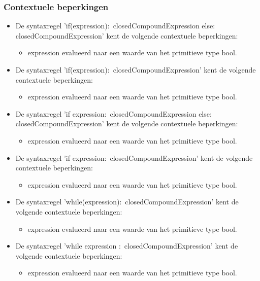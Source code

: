    \subsubsection{Contextuele beperkingen}
        \begin{itemize}
        \item De syntaxregel 'if(expression)$\colon$ closedCompoundExpression else$\colon$ closedCompoundExpression' kent de volgende contextuele beperkingen:
            \begin{itemize}
            \item expression evalueerd naar een waarde van het primitieve type bool.
            \end{itemize}
        \item De syntaxregel 'if(expression)$\colon$ closedCompoundExpression' kent de volgende contextuele beperkingen:
            \begin{itemize}
            \item expression evalueerd naar een waarde van het primitieve type bool.
            \end{itemize}
        \item De syntaxregel 'if expression$\colon$ closedCompoundExpression else$\colon$ closedCompoundExpression' kent de volgende contextuele beperkingen:
            \begin{itemize}
            \item expression evalueerd naar een waarde van het primitieve type bool.
            \end{itemize}
        \item De syntaxregel 'if expression$\colon$ closedCompoundExpression' kent de volgende contextuele beperkingen:
            \begin{itemize}
            \item expression evalueerd naar een waarde van het primitieve type bool.
            \end{itemize}
        \item De syntaxregel 'while(expression)$\colon$ closedCompoundExpression' kent de volgende contextuele beperkingen:
            \begin{itemize}
            \item expression evalueerd naar een waarde van het primitieve type bool.
            \end{itemize}
        \item De syntaxregel 'while expression $\colon$ closedCompoundExpression' kent de volgende contextuele beperkingen:
            \begin{itemize}
            \item expression evalueerd naar een waarde van het primitieve type bool.
            \end{itemize}
        \end{itemize}

